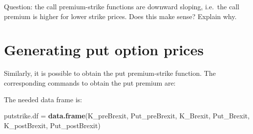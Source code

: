 \documentclass[]{book}
\newenvironment{Shaded}{\begin{snugshade}}{\end{snugshade}}
\newcommand{\KeywordTok}[1]{\textcolor[rgb]{0.13,0.29,0.53}{\textbf{#1}}}
\newcommand{\DataTypeTok}[1]{\textcolor[rgb]{0.13,0.29,0.53}{#1}}
\newcommand{\DecValTok}[1]{\textcolor[rgb]{0.00,0.00,0.81}{#1}}
\newcommand{\StringTok}[1]{\textcolor[rgb]{0.31,0.60,0.02}{#1}}
\newcommand{\OperatorTok}[1]{\textcolor[rgb]{0.81,0.36,0.00}{\textbf{#1}}}
\newcommand{\NormalTok}[1]{#1}
\theoremstyle{definition}
\theoremstyle{definition}
\theoremstyle{definition}
\theoremstyle{remark}
\begin{document}
Question: the call premium-strike functions are downward sloping,
i.e.~the call premium is higher for lower strike prices. Does this make
sense? Explain why.

\section{Generating put option
prices}\label{generating-put-option-prices}

Similarly, it is possible to obtain the put premium-strike function. The
corresponding commands to obtain the put premium are:

\begin{Shaded}
\end{Shaded}

The needed data frame is:

\begin{Shaded}
\begin{Highlighting}[]
\NormalTok{putstrike.df =}\StringTok{ }\KeywordTok{data.frame}\NormalTok{(K_preBrexit, Put_preBrexit, K_Brexit, Put_Brexit, }
\NormalTok{                           K_postBrexit, Put_postBrexit)}
\end{Highlighting}
\end{Shaded}
\end{document}

